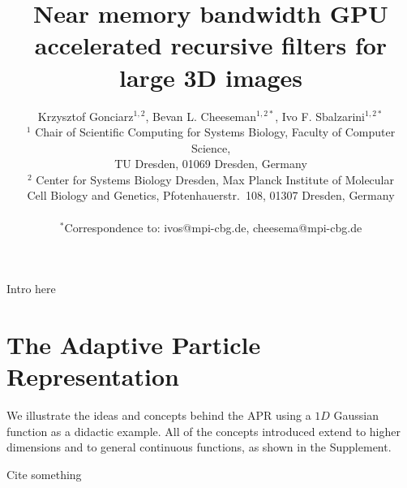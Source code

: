 \documentclass[9pt,twocolumn]{article}
\title{Near memory bandwidth GPU accelerated recursive filters for large 3D images}
\author
{Krzysztof Gonciarz$^{1,2}$, Bevan L. Cheeseman$^{1,2\ast}$, Ivo F. Sbalzarini$^{1,2\ast}$
	\\
	\normalsize{$^{1}$ Chair of Scientific Computing for Systems Biology, Faculty of Computer Science,}\\
	\normalsize{TU Dresden, 01069 Dresden, Germany} \\
	\normalsize{$^{2}$ Center for Systems Biology Dresden, Max Planck Institute of Molecular }\\
	\normalsize{Cell Biology and Genetics, Pfotenhauerstr.~108, 01307 Dresden, Germany}\\
	\\
	\normalsize{$^\ast$Correspondence to: ivos@mpi-cbg.de, cheesema@mpi-cbg.de}
}
\date{}
\begin{document}
 
	
	
	
	
	
	
	Intro here
	
	\section*{The Adaptive Particle Representation}
	We illustrate the ideas and concepts behind the APR using a $1D$ Gaussian function as a didactic example. All of the concepts introduced extend to higher dimensions and to general continuous functions, as shown in the Supplement.
	
	Cite something	\cite{KartalKoc2015marsreview}
	

	
	
	
\end{document}
